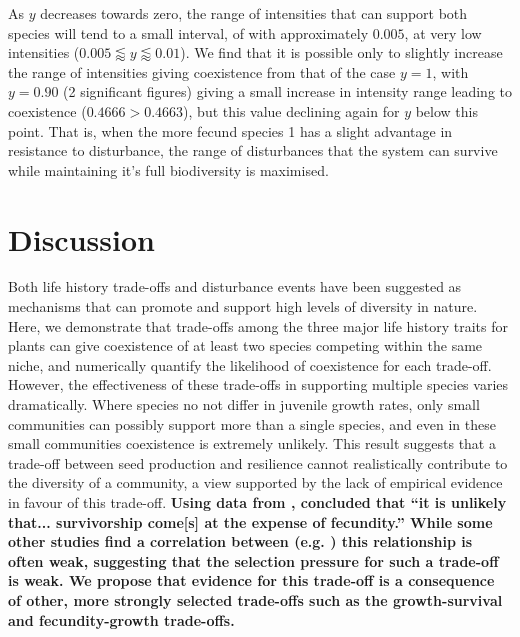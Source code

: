 \documentclass[preprint,10pt,reqno]{amsart}
\begin{document}
As $y$ decreases towards zero, the range of intensities that can support both species will tend to a small interval, of with approximately $0.005$, at very low intensities ($0.005\lessapprox y \lessapprox 0.01$). We find that it is possible only to slightly increase the range of intensities giving coexistence from that of the case $y=1$, with $y=0.90$ (2 significant figures) giving a small increase in intensity range leading to coexistence ($0.4666>0.4663$), but this value declining again for $y$ below this point. That is, when the more fecund species 1 has a slight advantage in resistance to disturbance, the range of disturbances that the system can survive while maintaining it's full biodiversity is maximised.

\section{Discussion}
Both life history trade-offs and disturbance events have been suggested as mechanisms that can promote and support high levels of diversity in nature. Here, we demonstrate that trade-offs among the three major life history traits for plants can give coexistence of at least two species competing within the same niche, and numerically quantify the likelihood of coexistence for each trade-off. However, the effectiveness of these trade-offs in supporting multiple species varies dramatically. Where species no not differ in juvenile growth rates, only small communities can possibly support more than a single species,  and even in these small communities coexistence is extremely unlikely. This result suggests that a trade-off between seed production and resilience cannot realistically contribute to the diversity of a community, a view supported by the lack of empirical evidence in favour of this trade-off. \textbf{Using data from \cite{martin2010dispersal}, \cite{martin2010divergence} concluded that ``it is unlikely that... survivorship come[s] at the expense of fecundity.'' While some other studies find a correlation between (e.g. \cite{marquis1984leaf,gwynn2005resistance}) this relationship is often weak, suggesting that the selection pressure for such a trade-off is weak. We propose that evidence for this trade-off is a consequence of other, more strongly selected trade-offs such as the growth-survival and fecundity-growth trade-offs.}
\end{document}

